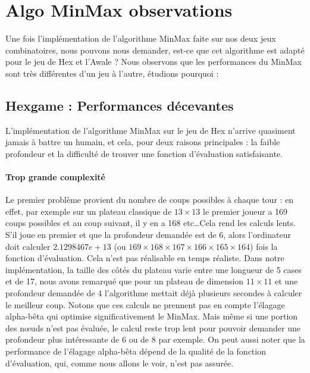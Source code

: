 




\section{Algo MinMax observations}
Une fois l'implémentation de l'algorithme MinMax faite sur nos deux
jeux combinatoires, nous pouvons nous demander, est-ce que cet algorithme est adapté pour le jeu de Hex et l'Awale ?
Nous observons que les performances du MinMax sont très différentes d'un jeu à l'autre, étudions pourquoi :

\subsection{Hexgame : Performances décevantes}
L'implémentation de l'algorithme MinMax sur le jeu de Hex n'arrive quasiment jamais à battre un humain, et cela, pour
deux raisons principales : la faible profondeur et la difficulté de trouver une fonction d'évaluation satisfaisante.

\paragraph{Trop grande complexité} Le premier problème provient du nombre de coups possibles à chaque tour :
en effet, par exemple sur un plateau classique de $13\times13$ le premier joueur a 169 coups possibles et au coup suivant, il y en a 168 etc\dots Cela rend les calculs lents. S'il joue en premier
et que la profondeur demandée est de 6, alors l'ordinateur doit calculer $2.1298467e+13$ (ou $169\times168\times167\times166\times165\times164$)
fois la fonction d'évaluation. Cela n'est pas réalisable en temps réaliste. Dans notre implémentation, la taille des côtés du plateau varie entre
une longueur de 5 cases et de 17, nous avons remarqué que pour un plateau de dimension $11\times11$ et une profondeur demandée de 4 l'algorithme
mettait déjà plusieurs secondes à calculer le meilleur coup. Notons que ces calculs ne prennent pas en compte l'élagage alpha-bêta
qui optimise significativement le MinMax. Mais même si une portion des nœuds n'est pas évaluée, le calcul reste trop lent pour pouvoir demander une
profondeur plus intéressante de 6 ou de 8 par exemple.
On peut aussi noter que la performance de l'élagage alpha-bêta dépend de la qualité de la fonction d'évaluation, qui, comme nous allons
le voir, n'est pas assurée.

